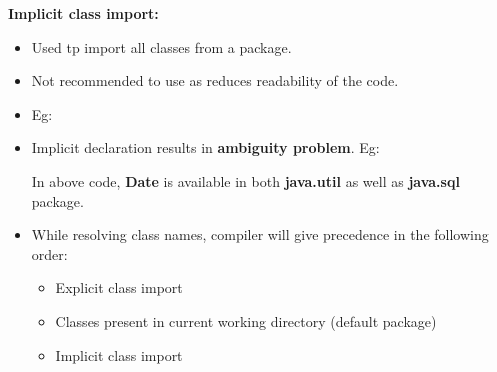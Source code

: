 \begin{flushleft}
		
		\textbf{Implicit class import:} 
		\begin{itemize}
			\item Used tp import all classes from a package.
			\item Not recommended to use as reduces readability of the code.
			\bigskip
			\item Eg:
		
			
			\item Implicit declaration results in \textbf{ambiguity problem}. Eg:

			

			\newpage			
			In above code, \textbf{Date} is available in both \textbf{java.util} as well as \textbf{java.sql} package.
			
			\item While resolving class names, compiler will give precedence in the following order:
			\begin{itemize}
				\item Explicit class import
				\item Classes present in current working directory (default package)
				\item Implicit class import
			\end{itemize}
			\bigskip
			\bigskip
		\end{itemize}
		

\end{flushleft}
